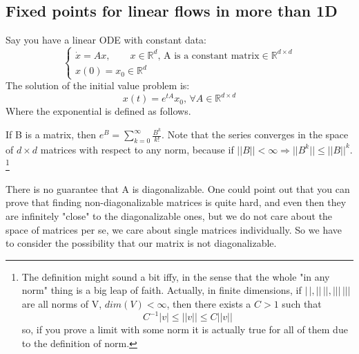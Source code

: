 \subsection{Fixed points for linear flows in more than 1D}
Say you have a linear ODE with constant data:
\begin{equation}
    \begin{cases}
        \dot{x}=Ax, \qquad x\in\mathbb{R}^d, \, \text{A is a constant matrix}\in\mathbb{R}^{d\times d} \\
        x(0)=x_0\in\mathbb{R}^d
    \end{cases}
    \label{eq:ivp_2d}
\end{equation}
The solution of the initial value problem is:
\begin{equation*}
    x(t)=e^{tA}x_0, \, \forall A\in\mathbb{R}^{d\times d}
\end{equation*}
Where the exponential is defined as follows.
\begin{definition}
    If B is a matrix, then $e^B=\sum_{k=0}^{\infty}\frac{B^k}{k!}$.
    Note that the series converges in the space of $d\times d$ matrices with respect to any norm, because if $||B||<\infty\Rightarrow||B^k||\leq ||B||^k$. \footnote{The definition might sound a bit iffy, in the sense that the whole "in any norm" thing is a big leap of faith. Actually, in finite dimensions, if $|\,|,||\,||, |||\,|||$ are all norms of V, $dim(V)<\infty$, then there exists a $C>1$ such that\begin{equation*}
        C^{-1}|v|\leq||v||\leq C||v||
    \end{equation*}
    so, if you prove a limit with some norm it is actually true for all of them due to the definition of norm.} 
\end{definition}
\begin{observation}
    There is no guarantee that A is diagonalizable. One could point out that you can prove that finding non-diagonalizable matrices is quite hard, and even then they are infinitely "close" to the diagonalizable ones, but we do not care about the space of matrices per se, we care about single matrices individually. So we have to consider the possibility that our matrix is not diagonalizable.
\end{observation}

